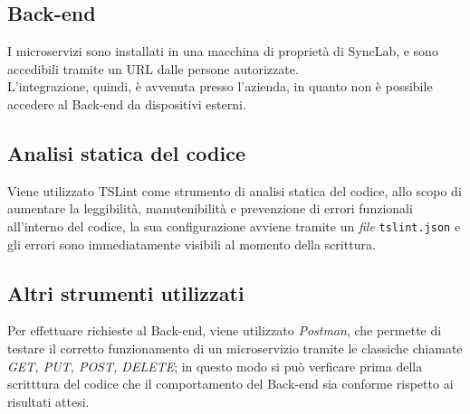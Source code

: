 
\subsection{Back-end}
I microservizi sono installati in una macchina di proprietà di SyncLab, e sono accedibili tramite un URL dalle persone autorizzate.\\
L'integrazione, quindi, è avvenuta presso l'azienda, in quanto non è possibile accedere al \gls{Back-end} da dispositivi esterni.

\subsection{Analisi statica del codice} \label{tslint}
Viene utilizzato TSLint come strumento di analisi statica del codice, allo scopo di aumentare la leggibilità, manutenibilità e prevenzione di errori funzionali all'interno del codice, la sua configurazione avviene tramite un \textit{file} \texttt{tslint.json} e gli errori sono immediatamente visibili al momento della scrittura.

\subsection{Altri strumenti utilizzati}
Per effettuare richieste al \gls{Back-end}, viene utilizzato \textit{Postman}, che permette di testare il corretto funzionamento di un microservizio tramite le classiche chiamate \textit{GET, PUT, POST, DELETE}; in questo modo si può verficare prima della scritttura del codice che il comportamento del \gls{Back-end} sia conforme rispetto ai risultati attesi.

